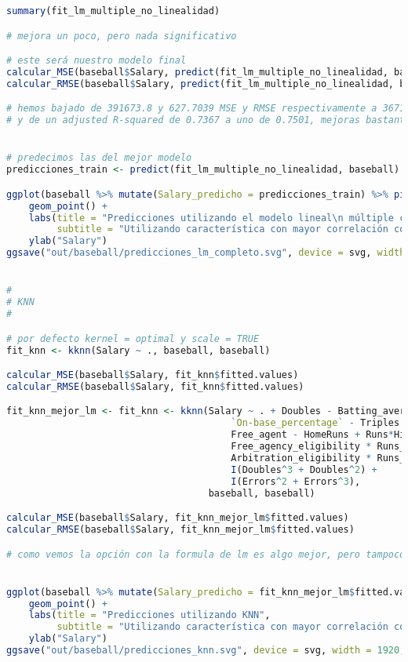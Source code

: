 \begin{lstlisting}[language=R]
summary(fit_lm_multiple_no_linealidad)

# mejora un poco, pero nada significativo

# este será nuestro modelo final
calcular_MSE(baseball$Salary, predict(fit_lm_multiple_no_linealidad, baseball))
calcular_RMSE(baseball$Salary, predict(fit_lm_multiple_no_linealidad, baseball))

# hemos bajado de 391673.8 y 627.7039 MSE y RMSE respectivamente a 367189.1 y 607.7675,
# y de un adjusted R-squared de 0.7367 a uno de 0.7501, mejoras bastante significativas


# predecimos las del mejor modelo
predicciones_train <- predict(fit_lm_multiple_no_linealidad, baseball)

ggplot(baseball %>% mutate(Salary_predicho = predicciones_train) %>% pivot_longer(Salary:Salary_predicho), aes(x = Runs_batted_in, y = value, color = name)) +
	geom_point() +
	labs(title = "Predicciones utilizando el modelo lineal\n múltiple con interacciones y no linealidad",
		 subtitle = "Utilizando característica con mayor correlación con el salario.") +
	ylab("Salary")
ggsave("out/baseball/predicciones_lm_completo.svg", device = svg, width = 1920, height = 1080, units = "px", dpi = 150)


#
# KNN
#

# por defecto kernel = optimal y scale = TRUE
fit_knn <- kknn(Salary ~ ., baseball, baseball)

calcular_MSE(baseball$Salary, fit_knn$fitted.values)
calcular_RMSE(baseball$Salary, fit_knn$fitted.values)

fit_knn_mejor_lm <- fit_knn <- kknn(Salary ~ . + Doubles - Batting_average - Walks -
										`On-base_percentage` - Triples - Arbitration + Errors -
										Free_agent - HomeRuns + Runs*Hits +
										Free_agency_eligibility * Runs_batted_in +
										Arbitration_eligibility * Runs_batted_in +
										I(Doubles^3 + Doubles^2) +
										I(Errors^2 + Errors^3),
									baseball, baseball)

calcular_MSE(baseball$Salary, fit_knn_mejor_lm$fitted.values)
calcular_RMSE(baseball$Salary, fit_knn_mejor_lm$fitted.values)

# como vemos la opción con la formula de lm es algo mejor, pero tampoco mucho


ggplot(baseball %>% mutate(Salary_predicho = fit_knn_mejor_lm$fitted.values) %>% pivot_longer(Salary:Salary_predicho), aes(x = Runs_batted_in, y = value, color = name)) +
	geom_point() +
	labs(title = "Predicciones utilizando KNN",
		 subtitle = "Utilizando característica con mayor correlación con el salario.") +
	ylab("Salary")
ggsave("out/baseball/predicciones_knn.svg", device = svg, width = 1920, height = 1080, units = "px", dpi = 150)




\end{lstlisting}
